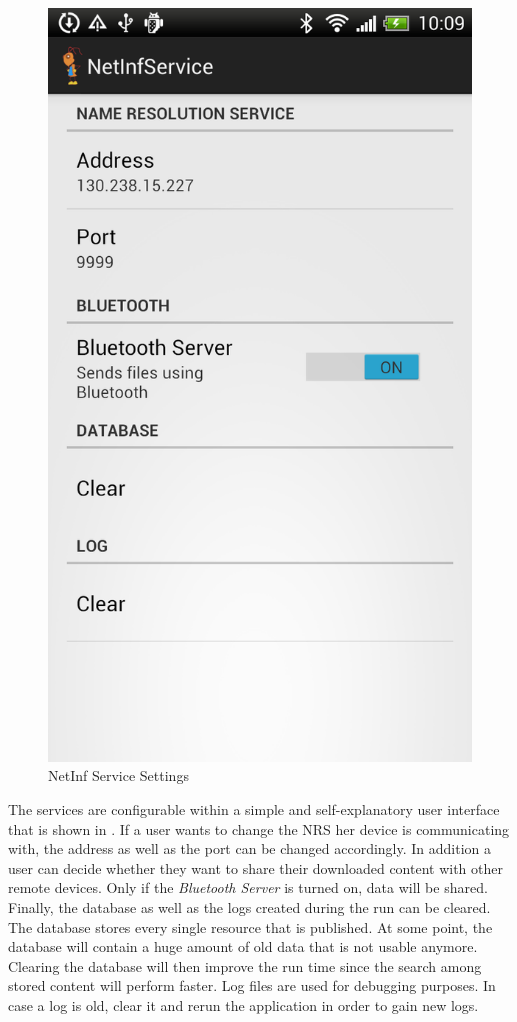 \begin{figure}
\centering
\includegraphics[scale=0.29]{img/ant_settings.png}
\caption{NetInf Service Settings}\label{fig:servicesettings}
\end{figure}

The services are configurable within a simple and self-explanatory user interface that is shown in .
If a user wants to change the NRS her device is communicating with, the address as well as the port can be changed accordingly.
In addition a user can decide whether they want to share their downloaded content with other remote devices. Only if the \textit{Bluetooth Server} 
is turned on, data will be shared.
Finally, the database as well as the logs created during the run can be cleared.
The database stores every single resource that is published. At some point, the database will contain a huge amount of old data that is not
usable anymore. Clearing the database will then improve the run time since the search among stored content will perform faster.
Log files are used for debugging purposes. In case a log is old, clear it and rerun the application in order to 
gain new logs.
